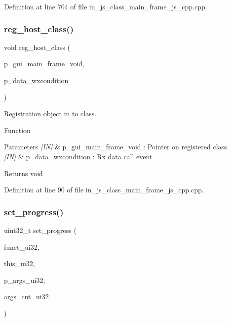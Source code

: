 Definition at line 704 of file in\+\_\+js\+\_\+class\+\_\+main\+\_\+frame\+\_\+js\+\_\+cpp.\+cpp.

\mbox{\label{group__main__frame_ga25e598d5efc99b6c91485f27d104802b}} 
\subsubsection{reg\_host\_class()}
{\footnotesize\ttfamily void reg\+\_\+host\+\_\+class (\begin{DoxyParamCaption}\item[{void $\ast$}]{p\+\_\+gui\+\_\+main\+\_\+frame\+\_\+void,  }\item[{wx\+Condition $\ast$}]{p\+\_\+data\+\_\+wxcondition }\end{DoxyParamCaption})}



Registration object in to class. 

Function
\begin{DoxyParams}{Parameters}
{\em \mbox{[}\+I\+N\mbox{]}} & p\+\_\+gui\+\_\+main\+\_\+frame\+\_\+void \+: Pointer on registered class \\
\hline
{\em \mbox{[}\+I\+N\mbox{]}} & p\+\_\+data\+\_\+wxcondition \+: Rx data call event \\
\hline
\end{DoxyParams}
\begin{DoxyReturn}{Returns}
void 
\end{DoxyReturn}


Definition at line 90 of file in\+\_\+js\+\_\+class\+\_\+main\+\_\+frame\+\_\+js\+\_\+cpp.\+cpp.

\mbox{\label{group__main__frame_ga6c9f339fd14b7f8053f4011f3900cfd2}} 
\subsubsection{set\_progress()}
{\footnotesize\ttfamily uint32\+\_\+t set\+\_\+progress (\begin{DoxyParamCaption}\item[{const uint32\+\_\+t}]{funct\+\_\+ui32,  }\item[{const uint32\+\_\+t}]{this\+\_\+ui32,  }\item[{const uint32\+\_\+t $\ast$}]{p\+\_\+args\+\_\+ui32,  }\item[{const uint32\+\_\+t}]{args\+\_\+cnt\+\_\+ui32 }\end{DoxyParamCaption})\hspace{0.3cm}{\ttfamily [static]}}



